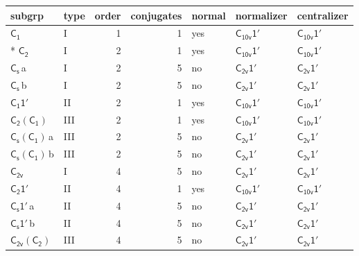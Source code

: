 \documentclass[10pt,a4paper]{article}
\numberwithin{equation}{section}
\newcommand{\grp}[1]{\mathsf{#1}}
\newcommand{\clsletter}[1]{\,{\scriptsize\color{black!55}#1}}
\begin{document}
{\small\begin{longtable}{@{}llrrlll@{}}\toprule
subgrp & type & order & conjugates & normal & normalizer & centralizer\\\midrule\endhead
\bottomrule\endfoot\endlastfoot
\href{../../../rotation/data/pdf/C1.pdf}{$\grp{C_{1}}$} & I & 1 & 1 & yes & \href{C10v-1p.pdf}{$\grp{C_{10v}1'}$} & \href{C10v-1p.pdf}{$\grp{C_{10v}1'}$}\\*
\href{../../../rotation/data/pdf/C2.pdf}{$\grp{C_{2}}$} & I & 2 & 1 & yes & \href{C10v-1p.pdf}{$\grp{C_{10v}1'}$} & \href{C10v-1p.pdf}{$\grp{C_{10v}1'}$}\\
\href{../../../rotation/data/pdf/C1v.pdf}{$\grp{C_{s}}$}\clsletter{a} & I & 2 & 5 & no & \href{C2v-1p.pdf}{$\grp{C_{2v}1'}$} & \href{C2v-1p.pdf}{$\grp{C_{2v}1'}$}\\
\href{../../../rotation/data/pdf/C1v.pdf}{$\grp{C_{s}}$}\clsletter{b} & I & 2 & 5 & no & \href{C2v-1p.pdf}{$\grp{C_{2v}1'}$} & \href{C2v-1p.pdf}{$\grp{C_{2v}1'}$}\\
\href{C1-1p.pdf}{$\grp{C_{1}1'}$} & II & 2 & 1 & yes & \href{C10v-1p.pdf}{$\grp{C_{10v}1'}$} & \href{C10v-1p.pdf}{$\grp{C_{10v}1'}$}\\
\href{C2-C1.pdf}{$\grp{C_{2}}(\grp{C_{1}})$} & III & 2 & 1 & yes & \href{C10v-1p.pdf}{$\grp{C_{10v}1'}$} & \href{C10v-1p.pdf}{$\grp{C_{10v}1'}$}\\
\href{C1v-C1.pdf}{$\grp{C_{s}}(\grp{C_{1}})$}\clsletter{a} & III & 2 & 5 & no & \href{C2v-1p.pdf}{$\grp{C_{2v}1'}$} & \href{C2v-1p.pdf}{$\grp{C_{2v}1'}$}\\
\href{C1v-C1.pdf}{$\grp{C_{s}}(\grp{C_{1}})$}\clsletter{b} & III & 2 & 5 & no & \href{C2v-1p.pdf}{$\grp{C_{2v}1'}$} & \href{C2v-1p.pdf}{$\grp{C_{2v}1'}$}\\
\href{../../../rotation/data/pdf/C2v.pdf}{$\grp{C_{2v}}$} & I & 4 & 5 & no & \href{C2v-1p.pdf}{$\grp{C_{2v}1'}$} & \href{C2v-1p.pdf}{$\grp{C_{2v}1'}$}\\
\href{C2-1p.pdf}{$\grp{C_{2}1'}$} & II & 4 & 1 & yes & \href{C10v-1p.pdf}{$\grp{C_{10v}1'}$} & \href{C10v-1p.pdf}{$\grp{C_{10v}1'}$}\\
\href{C1v-1p.pdf}{$\grp{C_{s}1'}$}\clsletter{a} & II & 4 & 5 & no & \href{C2v-1p.pdf}{$\grp{C_{2v}1'}$} & \href{C2v-1p.pdf}{$\grp{C_{2v}1'}$}\\
\href{C1v-1p.pdf}{$\grp{C_{s}1'}$}\clsletter{b} & II & 4 & 5 & no & \href{C2v-1p.pdf}{$\grp{C_{2v}1'}$} & \href{C2v-1p.pdf}{$\grp{C_{2v}1'}$}\\
\href{C2v-C2.pdf}{$\grp{C_{2v}}(\grp{C_{2}})$} & III & 4 & 5 & no & \href{C2v-1p.pdf}{$\grp{C_{2v}1'}$} & \href{C2v-1p.pdf}{$\grp{C_{2v}1'}$}\\

\end{longtable}}
\end{document}
